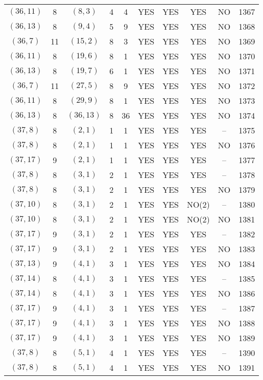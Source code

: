 \begin{longtable}{|c|c|c|c|c|c|c|c|c|c|}
$(36, 11)$ & 8 & $(8, 3)$ & 4 & 4 & YES & YES & YES & NO & 1367\\
$(36, 13)$ & 8 & $(9, 4)$ & 5 & 9 & YES & YES & YES & NO & 1368\\
$(36, 7)$ & 11 & $(15, 2)$ & 8 & 3 & YES & YES & YES & NO & 1369\\
$(36, 11)$ & 8 & $(19, 6)$ & 8 & 1 & YES & YES & YES & NO & 1370\\
$(36, 13)$ & 8 & $(19, 7)$ & 6 & 1 & YES & YES & YES & NO & 1371\\
$(36, 7)$ & 11 & $(27, 5)$ & 8 & 9 & YES & YES & YES & NO & 1372\\
$(36, 11)$ & 8 & $(29, 9)$ & 8 & 1 & YES & YES & YES & NO & 1373\\
$(36, 13)$ & 8 & $(36, 13)$ & 8 & 36 & YES & YES & YES & NO & 1374\\
$(37, 8)$ & 8 & $(2, 1)$ & 1 & 1 & YES & YES & YES & -- & 1375\\
$(37, 8)$ & 8 & $(2, 1)$ & 1 & 1 & YES & YES & YES & NO & 1376\\
$(37, 17)$ & 9 & $(2, 1)$ & 1 & 1 & YES & YES & YES & -- & 1377\\
$(37, 8)$ & 8 & $(3, 1)$ & 2 & 1 & YES & YES & YES & -- & 1378\\
$(37, 8)$ & 8 & $(3, 1)$ & 2 & 1 & YES & YES & YES & NO & 1379\\
$(37, 10)$ & 8 & $(3, 1)$ & 2 & 1 & YES & YES & NO(2) & -- & 1380\\
$(37, 10)$ & 8 & $(3, 1)$ & 2 & 1 & YES & YES & NO(2) & NO & 1381\\
$(37, 17)$ & 9 & $(3, 1)$ & 2 & 1 & YES & YES & YES & -- & 1382\\
$(37, 17)$ & 9 & $(3, 1)$ & 2 & 1 & YES & YES & YES & NO & 1383\\
$(37, 13)$ & 9 & $(4, 1)$ & 3 & 1 & YES & YES & YES & NO & 1384\\
$(37, 14)$ & 8 & $(4, 1)$ & 3 & 1 & YES & YES & YES & -- & 1385\\
$(37, 14)$ & 8 & $(4, 1)$ & 3 & 1 & YES & YES & YES & NO & 1386\\
$(37, 17)$ & 9 & $(4, 1)$ & 3 & 1 & YES & YES & YES & -- & 1387\\
$(37, 17)$ & 9 & $(4, 1)$ & 3 & 1 & YES & YES & YES & NO & 1388\\
$(37, 17)$ & 9 & $(4, 1)$ & 3 & 1 & YES & YES & YES & NO & 1389\\
$(37, 8)$ & 8 & $(5, 1)$ & 4 & 1 & YES & YES & YES & -- & 1390\\
$(37, 8)$ & 8 & $(5, 1)$ & 4 & 1 & YES & YES & YES & NO & 1391\\

\end{longtable}
